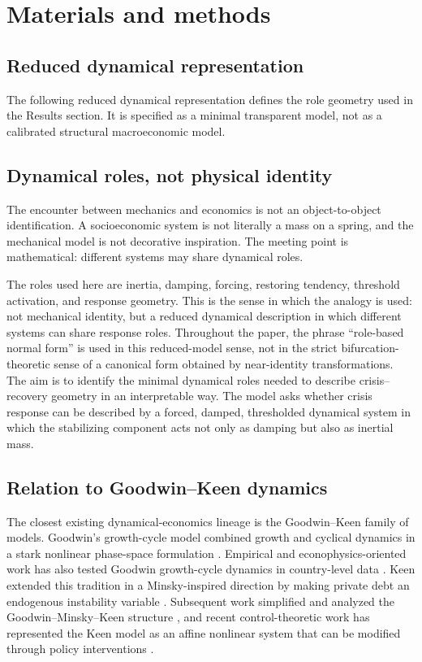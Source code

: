 \documentclass[11pt]{article}
\begin{document}
\section{Materials and methods}
\subsection{Reduced dynamical representation}
The following reduced dynamical representation defines the role geometry used in the Results section. It is specified as a minimal transparent model, not as a calibrated structural macroeconomic model.

\subsection{Dynamical roles, not physical identity}
The encounter between mechanics and economics is not an object-to-object identification. A socioeconomic system is not literally a mass on a spring, and the mechanical model is not decorative inspiration. The meeting point is mathematical: different systems may share dynamical roles.

The roles used here are inertia, damping, forcing, restoring tendency, threshold activation, and response geometry. This is the sense in which the analogy is used: not mechanical identity, but a reduced dynamical description in which different systems can share response roles. Throughout the paper, the phrase ``role-based normal form'' is used in this reduced-model sense, not in the strict bifurcation-theoretic sense of a canonical form obtained by near-identity transformations. The aim is to identify the minimal dynamical roles needed to describe crisis--recovery geometry in an interpretable way. The model asks whether crisis response can be described by a forced, damped, thresholded dynamical system in which the stabilizing component acts not only as damping but also as inertial mass.

\subsection{Relation to Goodwin--Keen dynamics}
The closest existing dynamical-economics lineage is the Goodwin--Keen family of models. Goodwin's growth-cycle model combined growth and cyclical dynamics in a stark nonlinear phase-space formulation \cite{Goodwin1967}. Empirical and econophysics-oriented work has also tested Goodwin growth-cycle dynamics in country-level data \cite{MouraRibeiro2013}. Keen extended this tradition in a Minsky-inspired direction by making private debt an endogenous instability variable \cite{Keen1995}. Subsequent work simplified and analyzed the Goodwin--Minsky--Keen structure \cite{Rammelt2019}, and recent control-theoretic work has represented the Keen model as an affine nonlinear system that can be modified through policy interventions \cite{PerezAvellaneda2024}.
\end{document}
